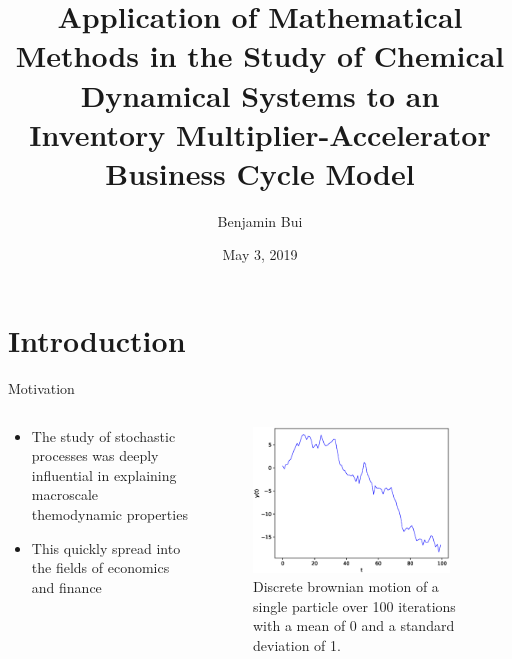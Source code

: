 \documentclass{beamer}
\title{Application of Mathematical Methods in the Study of Chemical Dynamical Systems to an Inventory Multiplier-Accelerator Business Cycle Model}
\author{Benjamin Bui}
\date{May 3, 2019}
\begin{document}
\begin{frame}
	\titlepage
\end{frame}

\section{Introduction}
\begin{frame}{Motivation}
	\begin{columns}
	\begin{column}{0.5\textwidth}
	\begin{itemize}
		\item The study of stochastic processes was deeply influential in explaining macroscale themodynamic properties

		\item This quickly spread into the fields of economics and finance 
	\end{itemize}
	\end{column}
	\begin{column}{0.5\textwidth}
		\begin{figure}
			\centering
			\includegraphics[width=0.9\textwidth]{brownian_motion.eps}
			\caption{Discrete brownian motion of a single particle over 100 iterations with a mean of 0 and a standard deviation of 1.}
		\end{figure}
	\end{column}
	\end{columns}
\end{frame}
\end{document}
